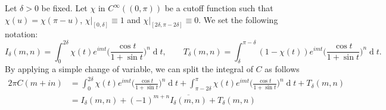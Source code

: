 \documentclass[12pt,a4paper,reqno]{amsart}
\theoremstyle{definition}
\theoremstyle{definition}\newtheorem{defn}[thm]{Definition}
\begin{document}
    Let $\delta>0$ be fixed. Let $\chi$ in $ C^\infty((0,\pi))$ be a cutoff function such that $\chi(u)=\chi(\pi-u)$, $\chi|_{[0,\delta]}\equiv 1$ and $\chi|_{[2\delta,\pi-2\delta]}\equiv 0$. We set the following notation:
    \[ 
        I_\delta(m,n)=\int_{0}^{2\delta}\chi(t) e^{imt} \Big(\frac{\cos t} {1+\sin t} \Big)^n\operatorname{d}\!t,\qquad
        T_\delta(m,n)=\int_{\delta}^{\pi-\delta} (1-\chi(t))e^{imt} \Big(\frac{\cos t} {1+\sin t} \Big)^n\operatorname{d}\!t.
    \]
    By applying a simple change of variable, we can split the integral of $C$ as follows
        \begin{align*}
            2\pi C(m+in)&=\int_{0}^{2\delta} \chi(t)e^{imt} \Big(\frac{\cos t} {1+\sin t} \Big)^n\operatorname{d}\!t+\int_{\pi-2\delta}^{\pi} \chi(t) e^{imt} \Big(\frac{\cos t} {1+\sin t} \Big)^n\operatorname{d}\!t+T_\delta(m,n)\\
        &=I_\delta(m,n)
        +(-1)^{m+n} \overline{I_\delta(m,n)} +T_\delta(m,n)
        \end{align*}
        
\end{document}
